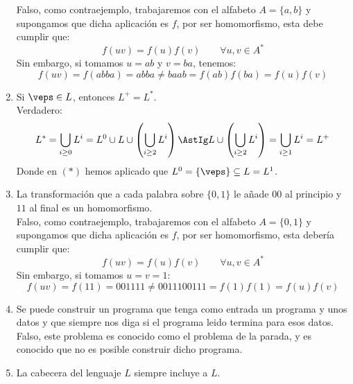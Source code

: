 \begin{enumerate}
        Falso, como contraejemplo, trabajaremos con el alfabeto $A=\{a,b\}$ y supongamos que dicha aplicación es $f$, por ser homomorfismo, esta debe cumplir que:
        \begin{equation*}
            f(uv) = f(u)f(v) \qquad \forall u,v\in A^\ast
        \end{equation*}
        Sin embargo, si tomamos $u=ab$ y $v=ba$, tenemos:
        \begin{equation*}
            f(uv) = f(abba) = abba \neq baab = f(ab)f(ba) = f(u)f(v)
        \end{equation*}
    \item \label{item:preg8}
    Si $\veps \in L$, entonces $L^+ = L^\ast$.\\

        Verdadero:
        \begin{equation*}
            L^\ast = \bigcup_{i\geq 0} L^i = L^0 \cup L \cup \left(\bigcup_{i\geq 2} L^i\right) \AstIg  L \cup \left(\bigcup_{i\geq 2} L^i\right) = \bigcup_{i\geq 1}L^i = L^+
        \end{equation*}
        Donde en $(\ast)$ hemos aplicado que $L^0 = \{\veps\} \subseteq L = L^1$.
    \item La transformación que a cada palabra sobre $\{0,1\}$ le añade $00$ al principio y $11$ al final es un homomorfismo.\\

        Falso, como contraejemplo, trabajaremos con el alfabeto $A=\{0,1\}$ y supongamos que dicha aplicación es $f$, por ser homomorfismo, esta debería cumplir que:
        \begin{equation*}
            f(uv) = f(u)f(v) \qquad \forall u,v\in A^\ast
        \end{equation*}
        Sin embargo, si tomamos $u = v = 1$:
        \begin{equation*}
            f(uv) = f(11) = 001111 \neq 0011100111 = f(1)f(1) = f(u)f(v)
        \end{equation*}
    \item Se puede construir un programa que tenga como entrada un programa y unos datos y que siempre nos diga si el programa leido termina para esos datos.\\

        Falso, este problema es conocido como el problema de la parada, y es conocido que no es posible construir dicho programa.
    \item La cabecera del lenguaje $L$ siempre incluye a $L$.\\
    

\end{enumerate}
